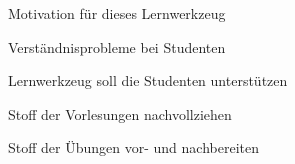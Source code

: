 



{
    \begin{itemgroup}{}
	\item Motivation für dieses Lernwerkzeug
		\begin{itemgroup}{}
		\item Verständnisprobleme bei Studenten
		\end{itemgroup}	
		\item Lernwerkzeug soll die Studenten unterstützen
			\begin{itemgroup}{}
			\item Stoff der Vorlesungen nachvollziehen
			\item Stoff der Übungen vor- und nachbereiten
			\end{itemgroup}
	\end{itemgroup}
    
	\vfill{}
}



